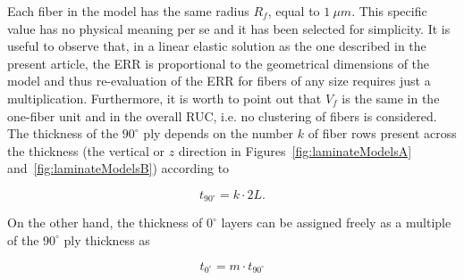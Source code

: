 \documentclass[review]{elsarticle}
\begin{document}
Each fiber in the model has the same radius $R_{f}$, equal to $1\ \mu m$. This specific value has no physical meaning per se and it has been selected for simplicity. It is useful to observe that, in a linear elastic solution as the one described in the present article, the ERR is proportional to the geometrical dimensions of the model and thus re-evaluation of the ERR for fibers of any size requires just a multiplication. Furthermore, it is worth to point out that $V_{f}$ is the same in the one-fiber unit and in the overall RUC, i.e. no clustering of fibers is considered.\\
The thickness of the $90^{\circ}$ ply depends on the number $k$ of fiber rows present across the thickness (the vertical or $z$ direction in Figures~\ref{fig:laminateModelsA} and~\ref{fig:laminateModelsB}) according to

\begin{equation}\label{eq:t90}
t_{90^{\circ}}=k\cdot2L.
\end{equation}

On the other hand, the thickness of $0^{\circ}$ layers can be assigned freely as a multiple of the $90^{\circ}$ ply thickness as

\begin{equation}\label{eq:t90}
t_{0^{\circ}}=m\cdot t_{90^{\circ}}
\end{equation}
\end{document}
